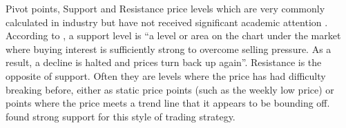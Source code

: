\documentclass[12pt]{article}
\theoremstyle{definition}
\begin{document}
Pivot points, Support and Resistance price levels which are very commonly calculated in industry but have not received significant academic attention \citep[p. 55]{osler2000support}. According to \cite{murphy1999technical}, a support level is ``a level or area on the chart under the market where buying interest is sufficiently strong to overcome selling pressure. As a result, a decline is halted and prices turn back up again''. Resistance is the opposite of support. Often they are levels where the price has had difficulty breaking before, either as static price points (such as the weekly low price) or points where the price meets a trend line that it appears to be bounding off. \cite{brock1992} found strong support for this style of trading strategy.




\end{document}
